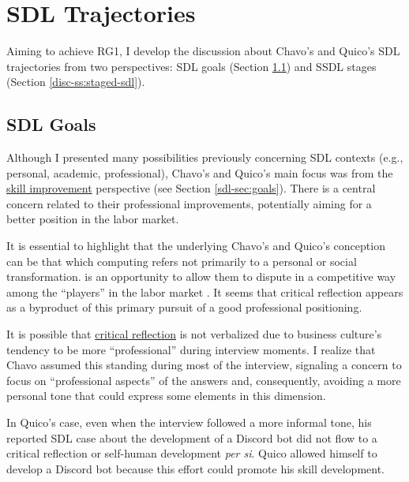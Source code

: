 \section{SDL Trajectories}
\label{disc-sec:sdl-trajectories}

Aiming to achieve \gls{RG}1, I develop the discussion about Chavo's and Quico's \gls{SDL} trajectories from two perspectives: \gls{SDL} goals (Section \ref{disc-ss:sdl-goals}) and \gls{SSDL} stages (Section \ref{disc-ss:staged-sdl}).

\subsection{SDL Goals}
\label{disc-ss:sdl-goals}

Although I presented many possibilities previously concerning \gls{SDL} contexts (e.g., personal, academic, professional), Chavo's and Quico's main focus was from the \underline{skill improvement} perspective (see Section \ref{sdl-sec:goals}). There is a central concern related to their professional improvements, potentially aiming for a better position in the labor market.

It is essential to highlight that the underlying Chavo's and Quico's conception can be that which computing refers not primarily to a personal or social transformation.  is an opportunity to allow them to dispute in a competitive way among the ``players'' in the labor market \cite[p.~428]{bispojr:2024-nmp}. It seems that critical reflection appears as a byproduct of this primary pursuit of a good professional positioning.

It is possible that \underline{critical reflection} is not verbalized due to business culture's tendency to be more ``professional'' during interview moments. I realize that Chavo assumed this standing during most of the interview, signaling a concern to focus on ``professional aspects'' of the answers and, consequently, avoiding a more personal tone that could express some elements in this dimension.

In Quico's case, even when the interview followed a more informal tone, his reported \gls{SDL} case about the development of a Discord bot did not flow to a critical reflection or self-human development \textit{per si}. Quico allowed himself to develop a Discord bot because this effort could promote his skill development.


